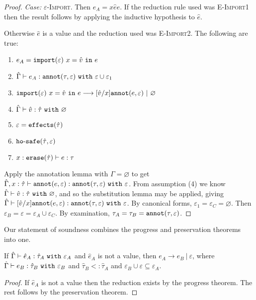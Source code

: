 \begin{proof}
\textit{Case:} \textsc{$\varepsilon$-Import}. Then $e_A = {x}{\hat e}{e}$. If the reduction rule used was \textsc{E-Import1} then the result follows by applying the inductive hypothesis to $\hat e$.

Otherwise $\hat e$ is a value and the reduction used was \textsc{E-Import2}. The following are true:
\begin{enumerate}
	\setlength\itemsep{-0.7em}
	\item $e_A = \mathtt{import}(\varepsilon)~x = \hat v~\mathtt{in}~ e$
	\item $\hat \Gamma \vdash e_A: \mathtt{annot}(\tau, \varepsilon)~\mathtt{with}~ \varepsilon \cup \varepsilon_1$
	\item $\mathtt{import}(\varepsilon)~x = \hat v~\mathtt{in}~ e \longrightarrow [\hat v/x]\mathtt{annot}(e, \varepsilon)~|~\varnothing$
	\item $\hat \Gamma \vdash \hat v: \hat \tau~\mathtt{with}~ \varnothing$
	\item $\varepsilon = \mathtt{effects}(\hat \tau)$
	\item $\mathtt{ho \hbox{-} safe}(\hat \tau, \varepsilon)$
	\item $x: \mathtt{erase}(\hat \tau) \vdash e: \tau$
\end{enumerate}

\noindent
Apply the annotation lemma with $\Gamma = \varnothing$ to get $\hat \Gamma, x: \hat \tau \vdash \mathtt{annot}(e, \varepsilon): \mathtt{annot}(\tau, \varepsilon)~\mathtt{with}~ \varepsilon$. From assumption (4) we know $\hat \Gamma \vdash \hat v: \hat \tau~\mathtt{with}~ \varnothing$, and so the substitution lemma may be applied, giving $\hat \Gamma \vdash [\hat v/x]\mathtt{annot}(e, \varepsilon): \mathtt{annot}(\tau, \varepsilon)~\mathtt{with}~ \varepsilon$. By canonical forms, $\varepsilon_1 = \varepsilon_C = \varnothing$. Then $\varepsilon_B = \varepsilon = \varepsilon_A \cup \varepsilon_C$. By examination, $\tau_A = \tau_B = \mathtt{annot}(\tau, \varepsilon)$.
\end{proof}

\noindent
Our statement of soundness combines the progress and preservation theorems into one.

\begin{theorem}[Soundness]
If $\hat \Gamma \vdash \hat e_A: \hat \tau_A~\mathtt{with}~ \varepsilon_A$ and $\hat e_A$ is not a value, then $e_A \longrightarrow e_B~|~\varepsilon$, where $\hat \Gamma \vdash e_B: \hat \tau_B~\mathtt{with}~ \varepsilon_B$ and $\hat \tau_B <: \hat \tau_A$ and $\varepsilon_B \cup \varepsilon \subseteq \varepsilon_A$.
\end{theorem}
\begin{proof}
If $\hat e_A$ is not a value then the reduction exists by the progress theorem. The rest follows by the preservation theorem.
\end{proof}

